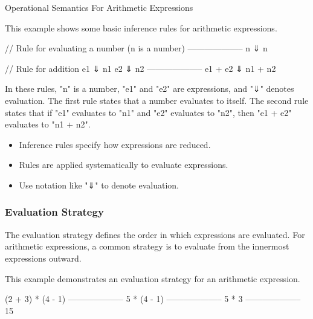 \begin{notes}{Operational Semantics For Arithmetic Expressions}
    \begin{highlight}
    
        This example shows some basic inference rules for arithmetic expressions.
    
    \begin{code}
    // Rule for evaluating a number
    (n is a number)
    --------------------
    n ⇓ n
    
    // Rule for addition
    e1 ⇓ n1   e2 ⇓ n2
    --------------------
    e1 + e2 ⇓ n1 + n2
    \end{code}
    
        In these rules, "n" is a number, "e1" and "e2" are expressions, and "⇓" denotes evaluation. The first rule states that a number evaluates to itself. The second rule states that if "e1" evaluates 
        to "n1" and "e2" evaluates to "n2", then "e1 + e2" evaluates to "n1 + n2".
        
        \begin{itemize}
            \item Inference rules specify how expressions are reduced.
            \item Rules are applied systematically to evaluate expressions.
            \item Use notation like "⇓" to denote evaluation.
        \end{itemize}
    
    \end{highlight}
    
    \subsubsection*{Evaluation Strategy}
    
    The evaluation strategy defines the order in which expressions are evaluated. For arithmetic expressions, a common strategy is to evaluate from the innermost expressions outward.
    
    \begin{highlight}
    
        This example demonstrates an evaluation strategy for an arithmetic expression.
    
    \begin{code}
    (2 + 3) * (4 - 1)
    --------------------
    5 * (4 - 1)
    --------------------
    5 * 3
    --------------------
    15
    \end{code}
    

\end{highlight}
\end{notes}
